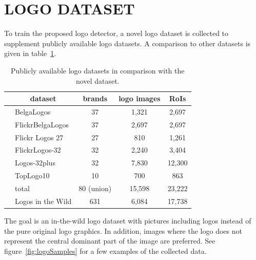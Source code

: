 \documentclass[a4paper,twoside]{article}
\newcommand{\vertboxs}[1]{\rotatebox{90}{\parbox{14mm}{\centering #1}}}
\newcommand{\vertboxt}[1]{\rotatebox{90}{\parbox{10mm}{\centering #1}}}
\begin{document}
\section{\uppercase{Logo Dataset}}
\noindent To train the proposed logo detector, a novel logo dataset is collected to supplement publicly available logo datasets. A comparison to other datasets is given in table~\ref{tab:logoDatasets}.
%
\begin{table}[t]
\centering
\caption{Publicly available logo datasets in comparison with the novel dataset.}
\label{tab:logoDatasets}
\begin{small}
\begin{tabular}{cl|ccc}
& \multicolumn{1}{c|}{\textbf{dataset}} & \textbf{brands} & \textbf{logo images} & \textbf{RoIs} \bigstrut[b]\\
\hline
\multirow{8}{*}{\vertboxs{public}} & BelgaLogos \cite{joly2009,letessier2012} & 37 & 1,321 & 2,697 \bigstrut[t] \\
& FlickrBelgaLogos \cite{letessier2012} & 37 & 2,697 & 2,697 \\
& Flickr Logos 27 \cite{kalantidis2011} & 27 & 810 & 1,261 \\
& FlickrLogos-32 \cite{romberg2011} & 32 & 2,240 & 3,404 \\
& Logos-32plus \cite{bianco2015,bianco2017} & 32 & 7,830 & 12,300 \\
& TopLogo10 \cite{su2016} & 10 & 700 & 863 \bigstrut[b] \\
\cline{2-5}
& total & 80 (union) & 15,598 & 23,222 \bigstrut \\
\hline
\begin{minipage}[c]{0.1cm}\vertboxt{new}\end{minipage} & Logos in the Wild & 631 & 6,084 & 17,738 \bigstrut[t]
\end{tabular}
\end{small}
\end{table}
%
The goal is an in-the-wild logo dataset with pictures including logos instead of the pure original logo graphics. In addition, images where the logo does not represent the central dominant part of the image are preferred. See figure~\ref{fig:logoSamples} for a few examples of the collected data.
\end{document}
